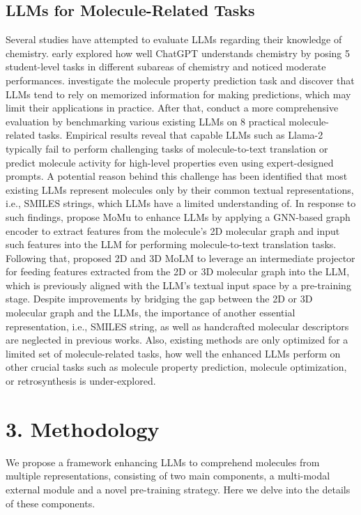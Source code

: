 \subsection{LLMs for Molecule-Related Tasks}
Several studies have attempted to evaluate LLMs regarding their knowledge of chemistry. \citet{castro2023large} early explored how well ChatGPT understands chemistry by posing 5 student-level tasks in different subareas of chemistry and noticed moderate performances. \citet{zhao2023scientific} investigate the molecule property prediction task and discover that LLMs tend to rely on memorized information for making predictions, which may limit their applications in practice. After that, \citet{guo2023can} conduct a more comprehensive evaluation by benchmarking various existing LLMs on 8 practical molecule-related tasks. Empirical results reveal that capable LLMs such as Llama-2 \cite{touvron2023llama} typically fail to perform challenging tasks of molecule-to-text translation or predict molecule activity for high-level properties even using expert-designed prompts. A potential reason behind this challenge has been identified that most existing LLMs represent molecules only by their common textual representations, i.e., SMILES strings, which LLMs have a limited understanding of. In response to such findings, \citet{su2022molecular} propose MoMu to enhance LLMs by applying a GNN-based graph encoder to extract features from the molecule’s 2D molecular graph and input such features into the LLM for performing molecule-to-text translation tasks. Following that, \citet{li2023towards} proposed 2D and 3D MoLM to leverage an intermediate projector for feeding features extracted from the 2D or 3D molecular graph into the LLM, which is previously aligned with the LLM’s textual input space by a pre-training stage. Despite improvements by bridging the gap between the 2D or 3D molecular graph and the LLMs, the importance of another essential representation, i.e., SMILES string, as well as handcrafted molecular descriptors are neglected in previous works. Also, existing methods are only optimized for a limited set of molecule-related tasks, how well the enhanced LLMs perform on other crucial tasks such as molecule property prediction, molecule optimization, or retrosynthesis is under-explored. 

\section{3. Methodology}
We propose a framework enhancing LLMs to comprehend molecules from multiple representations, consisting of two main components, a multi-modal external module and a novel pre-training strategy. Here we delve into the details of these components. 

